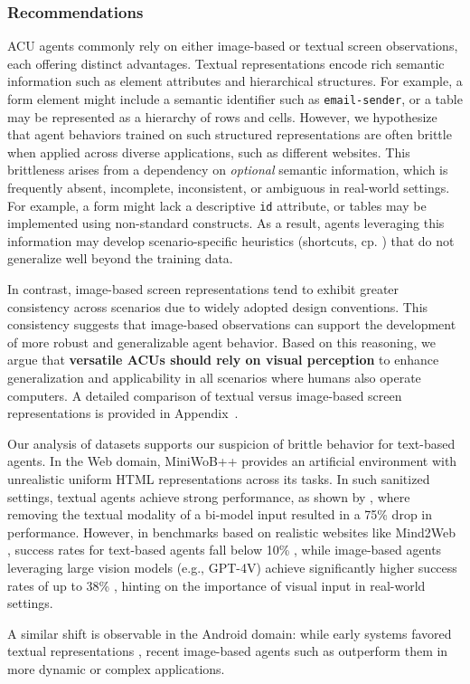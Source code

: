 \subsubsection{Recommendations}
ACU agents commonly rely on either image-based or textual screen observations, each offering distinct advantages. 
Textual representations encode rich semantic information such as element attributes and hierarchical structures.
For example, a form element might include a semantic identifier such as \texttt{email-sender}, or a table may be represented as a hierarchy of rows and cells.
However, we hypothesize that agent behaviors trained on such structured representations are often brittle when applied across diverse applications, such as different websites.
This brittleness arises from a dependency on \emph{optional} semantic information, which is frequently absent, incomplete, inconsistent, or ambiguous in real-world settings.
For example, a form might lack a descriptive \texttt{id} attribute, or tables may be implemented using non-standard constructs. As a result, agents leveraging this information may develop scenario-specific heuristics (shortcuts, cp. \citet{geirhos2020shortcut}) that do not generalize well beyond the training data.

In contrast, image-based screen representations tend to exhibit greater consistency across scenarios due to widely adopted design conventions.
This consistency suggests that image-based observations can support the development of more robust and generalizable agent behavior. 
Based on this reasoning, we argue that \textbf{versatile ACUs should rely on visual perception} to enhance generalization and applicability in all scenarios where humans also operate computers.
A detailed comparison of textual versus image-based screen representations is provided in Appendix~.

Our analysis of datasets supports our suspicion of brittle behavior for text-based agents.
In the Web domain, MiniWoB++ \citep{shi_world_2017,liu_reinforcement_2018} provides an artificial environment with unrealistic uniform HTML representations across its tasks.
In such sanitized settings, textual agents achieve strong performance, as shown by \citet{humphreys_data-driven_2022}, where removing the textual modality of a bi-model input resulted in a 75\% drop in performance.
However, in benchmarks based on realistic websites like Mind2Web \citep{deng_mind2web_2023}, success rates for text-based agents fall below 10\% \citep{deng_mind2web_2023, gur_real-world_2024, furuta_multimodal_2024}, while image-based agents leveraging large vision models (e.g., GPT-4V) achieve significantly higher success rates of up to 38\% \citep{zheng_gpt-4vision_2024}, hinting on the importance of visual input in real-world settings.

A similar shift is observable in the Android domain: while early systems favored textual representations \citep{wang_enabling_2023, shvo_appbuddy_2021}, recent image-based agents such as \citep{zhang_appagent_2023} outperform them in more dynamic or complex applications. 


